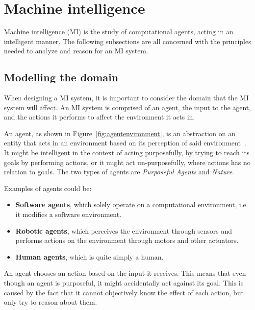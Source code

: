 \section{Machine intelligence}\label{theory:machineintelligence}
Machine intelligence (MI) is the study of computational agents, acting in an intelligent manner.
The following subsections are all concerned with the principles needed to analyze and reason for an MI system.

\subsection{Modelling the domain}\label{Theory:MIModelling}
When designing a MI system, it is important to consider the domain that the MI system will affect.
An MI system is comprised of an agent, the input to the agent, and the actions it performs to affect the environment it acts in.



An agent, as shown in Figure~\ref{fig:agentenvironment}, is an abstraction on an entity that acts in an environment based on its perception of said environment~\cite{ArtificialIntelligencealanpoole}.
It might be intelligent in the context of acting purposefully, by trying to reach its goals by performing actions, or it might act un-purposefully, where actions has no relation to goals.
The two types of agents are \textit{Purposeful Agents} and \textit{Nature}.

Examples of agents could be:
\begin{itemize}
	\item \textbf{Software agents}, which solely operate on a computational environment, i{.}e{.} it modifies a software environment.
	\item \textbf{Robotic agents}, which perceives the environment through sensors and performs actions on the environment through motors and other actuators.
	\item \textbf{Human agents}, which is quite simply a human. 
\end{itemize}

An agent chooses an action based on the input it receives.
This means that even though an agent is purposeful, it might accidentally act against its goal.
This is caused by the fact that it cannot objectively know the effect of each action, but only try to reason about them.

